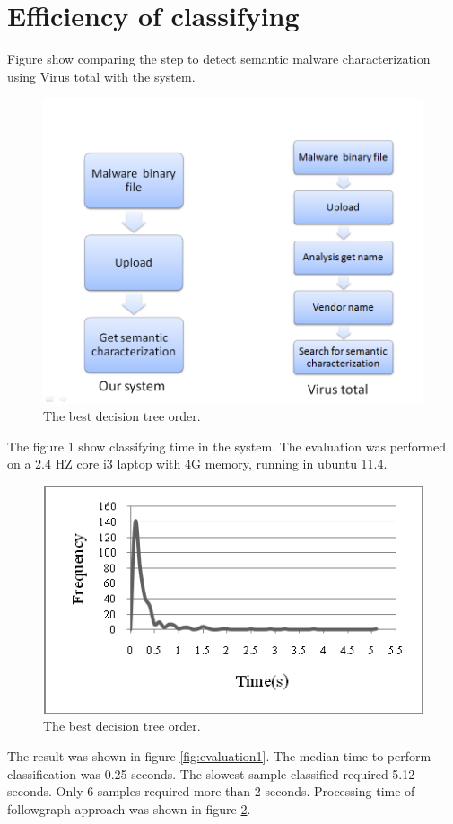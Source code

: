 \section{Efficiency of classifying}
Figure show comparing the step to detect semantic malware characterization using Virus total with the system.
 \begin{figure}[httb]
  \centering
    \includegraphics[width=1\textwidth]{graph/evaluation3.png}
     \caption{The best decision tree order.}
     \label{fig:evaluation3}
\end{figure}

The figure 1 show classifying time in the system. The evaluation was performed on a 2.4 HZ core i3 laptop with 4G memory, running in ubuntu 11.4. 	

\begin{figure}[httb]
  \centering
    \includegraphics[width=1\textwidth]{graph/evaluation2.png}
     \caption{The best decision tree order.}
     \label{fig:evaluation2}
\end{figure}
The result was shown in figure \ref{fig:evaluation1}. The median time to perform classification was 0.25 seconds. The slowest sample classified required 5.12 seconds. Only 6 samples required more than 2 seconds. Processing time of followgraph approach was shown in figure \ref{fig:evaluation2}.

